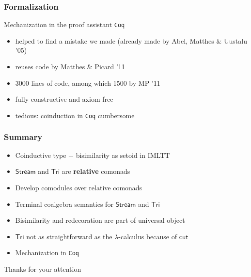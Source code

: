 \documentclass[
]
{beamer}
\newcommand{\constfont}[1]{\ensuremath{\mathsf{#1}}}
\newcommand{\Tri}{\constfont{Tri}}
\newcommand{\stream}{\constfont{Stream}}
\newcommand{\redec}{\constfont{redec}}
\newcommand{\cut}{\constfont{cut}}
\newcommand{\Setoid}{\constfont{Setoid}}
\newcommand{\fat}[1]{\textbf{#1}}
\begin{document}

\begin{comment}
\begin{frame}
 \frametitle{Closing remarks}
 
   \begin{block}{Higher order compatibility}
    Observing that $\Setoid$ is cartesian closed, one can encode
       \[ f \sim g  \Longrightarrow \redec~f \sim \redec~g\]
    in definition of coalgebra for signature of $\Tri$
   \end{block}
\end{frame}
\end{comment}
 
\begin{frame}
  \frametitle{Formalization}
   \begin{block}{Mechanization in the proof assistant \texttt{Coq}}
      \begin{itemize}\setlength{\itemsep}{1em}
       \item helped to find a mistake we made (already made by Abel, Matthes \& Uustalu '05)
       \item reuses code by Matthes \& Picard '11
       \item 3000 lines of code, among which 1500 by MP '11
       \item fully constructive and axiom-free
       \item tedious: coinduction in \texttt{Coq} cumbersome
      \end{itemize}
   \end{block}
   
\end{frame}

\begin{frame}
 \frametitle{Summary}
  
   \begin{itemize}\setlength{\itemsep}{1em}
    \item Coinductive type + bisimilarity as setoid in IMLTT
    \item $\stream$ and $\Tri$ are \fat{relative} comonads
    \item Develop comodules over relative comonads
    \item Terminal coalgebra semantics for $\stream$ and $\Tri$
    \item Bisimilarity and redecoration are part of universal object
    \item $\Tri$ not as straightforward as the $\lambda$-calculus because of $\cut$
    \item Mechanization in \texttt{Coq}
   \end{itemize}

   \pause \begin{center} Thanks for your attention \end{center}
   
\end{frame}
\end{document}

